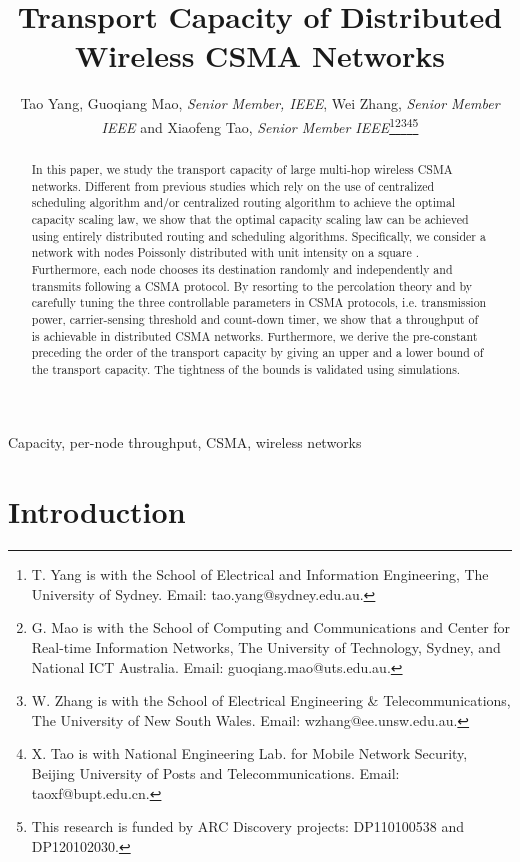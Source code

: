 \documentclass[english]{IEEEtran}
\theoremstyle{plain}
\theoremstyle{plain}
\theoremstyle{plain}
\theoremstyle{remark}
\begin{document}
\title{Transport Capacity of Distributed Wireless CSMA Networks}


\author{Tao Yang, Guoqiang Mao, \emph{Senior Member, IEEE}, Wei Zhang, \emph{Senior
Member IEEE} and Xiaofeng Tao, \emph{Senior Member IEEE}\thanks{T. Yang is with the School of Electrical and Information Engineering,
The University of Sydney. Email: tao.yang@sydney.edu.au.}\emph{}\thanks{G. Mao is with the School of Computing and Communications and Center
for Real-time Information Networks, The University of Technology,
Sydney, and National ICT Australia. Email: guoqiang.mao@uts.edu.au.}\emph{}\thanks{W. Zhang is with the School of Electrical Engineering \& Telecommunications,
The University of New South Wales. Email: wzhang@ee.unsw.edu.au.}\emph{}\thanks{X. Tao is with National Engineering Lab. for Mobile Network Security, Beijing University of Posts and Telecommunications. Email: taoxf@bupt.edu.cn.}\emph{}\thanks{This research is funded by ARC Discovery projects: DP110100538 and
DP120102030.}}
\maketitle
\begin{abstract}
In this paper, we study the transport capacity of large multi-hop
wireless CSMA networks. Different from previous studies which rely
on the use of centralized scheduling algorithm and/or centralized
routing algorithm to achieve the optimal capacity scaling law, we
show that the optimal capacity scaling law can be achieved using entirely
distributed routing and scheduling algorithms. Specifically, we consider
a network with nodes Poissonly distributed with unit intensity on
a  square . Furthermore,
each node chooses its destination randomly and independently and transmits
following a CSMA protocol. By resorting to the percolation theory
and by carefully tuning the three controllable parameters in CSMA
protocols, i.e. transmission power, carrier-sensing threshold and
count-down timer, we show that a throughput of 
is achievable in distributed CSMA networks. Furthermore, we derive
the pre-constant preceding the order of the transport capacity by
giving an upper and a lower bound of the transport capacity. The tightness
of the bounds is validated using simulations.\end{abstract}
\begin{IEEEkeywords}
Capacity, per-node throughput, CSMA, wireless networks 
\end{IEEEkeywords}

\section{Introduction\label{sec:Introduction}}
\end{document}

